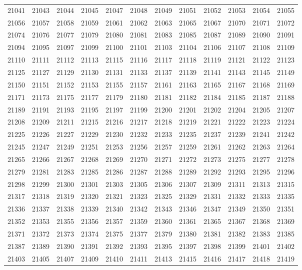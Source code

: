 \begin{center}
\begin{longtable}{llllllllllll}
21041 &21043 &21044 &21045 &21047 &21048 &21049 &21051 &21052 &21053 &21054 &21055 \\
21056 &21057 &21058 &21059 &21061 &21062 &21063 &21065 &21067 &21070 &21071 &21072 \\
21074 &21076 &21077 &21079 &21080 &21081 &21083 &21085 &21087 &21089 &21090 &21091 \\
21094 &21095 &21097 &21099 &21100 &21101 &21103 &21104 &21106 &21107 &21108 &21109 \\
21110 &21111 &21112 &21113 &21115 &21116 &21117 &21118 &21119 &21121 &21122 &21123 \\
21125 &21127 &21129 &21130 &21131 &21133 &21137 &21139 &21141 &21143 &21145 &21149 \\
21150 &21151 &21152 &21153 &21155 &21157 &21161 &21163 &21165 &21167 &21168 &21169 \\
21171 &21173 &21175 &21177 &21179 &21180 &21181 &21182 &21184 &21185 &21187 &21188 \\
21189 &21191 &21193 &21195 &21197 &21199 &21200 &21201 &21202 &21204 &21205 &21207 \\
21208 &21209 &21211 &21215 &21216 &21217 &21218 &21219 &21221 &21222 &21223 &21224 \\
21225 &21226 &21227 &21229 &21230 &21232 &21233 &21235 &21237 &21239 &21241 &21242 \\
21245 &21247 &21249 &21251 &21253 &21256 &21257 &21259 &21261 &21262 &21263 &21264 \\
21265 &21266 &21267 &21268 &21269 &21270 &21271 &21272 &21273 &21275 &21277 &21278 \\
21279 &21281 &21283 &21285 &21286 &21287 &21288 &21289 &21292 &21293 &21295 &21296 \\
21298 &21299 &21300 &21301 &21303 &21305 &21306 &21307 &21309 &21311 &21313 &21315 \\
21317 &21318 &21319 &21320 &21321 &21323 &21325 &21329 &21331 &21332 &21333 &21335 \\
21336 &21337 &21338 &21339 &21340 &21342 &21343 &21346 &21347 &21349 &21350 &21351 \\
21352 &21353 &21355 &21356 &21357 &21359 &21360 &21361 &21365 &21367 &21368 &21369 \\
21371 &21372 &21373 &21374 &21375 &21377 &21379 &21380 &21381 &21382 &21383 &21385 \\
21387 &21389 &21390 &21391 &21392 &21393 &21395 &21397 &21398 &21399 &21401 &21402 \\
21403 &21405 &21407 &21409 &21410 &21411 &21413 &21415 &21416 &21417 &21418 &21419 \\

\end{longtable}
\end{center}

